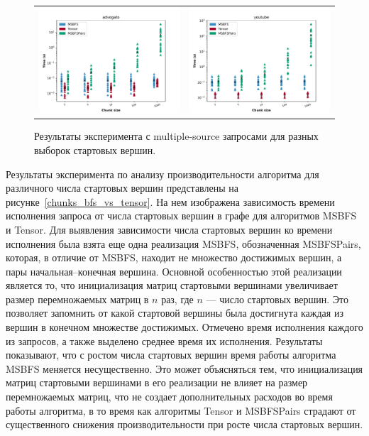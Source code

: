 \begin{figure}
\begin{tabular}{cc}
        \includegraphics[width=85mm]{pictures/chunks-advogato.pdf}   & \includegraphics[width=85mm]{pictures/chunks-youtube.pdf}  \\
    \end{tabular}
    \caption{Результаты эксперимента с multiple-source запросами для разных выборок стартовых вершин.}
\end{figure}\label{chunks_bfs_vs_tensor}

Результаты эксперимента по анализу производительности алгоритма для различного числа стартовых вершин представлены на рисунке~\ref{chunks_bfs_vs_tensor}. На нем изображена зависимость времени исполнения запроса от числа стартовых вершин в графе для алгоритмов MSBFS и Tensor. Для выявления зависимости числа стартовых вершин ко времени исполнения была взята еще одна реализация MSBFS, обозначенная MSBFSPairs, которая, в отличие от MSBFS, находит не множество достижимых вершин, а пары начальная--конечная вершина. Основной особенностью этой реализации является то, что инициализация матриц стартовыми вершинами увеличивает размер перемножаемых матриц в $n$ раз, где $n$ --- число стартовых вершин. Это позволяет запомнить от какой стартовой вершины была достигнута каждая из вершин в конечном множестве достижимых. Отмечено время исполнения каждого из запросов, а также выделено среднее время их исполнения. Результаты показывают, что с ростом числа стартовых вершин время работы алгоритма MSBFS меняется несущественно. Это может объясняться тем, что инициализация матриц стартовыми вершинами в его реализации не влияет на размер перемножаемых матриц, что не создает дополнительных расходов во время работы алгоритма, в то время как алгоритмы Tensor и MSBFSPairs страдают от существенного снижения производительности при росте числа стартовых вершин.


